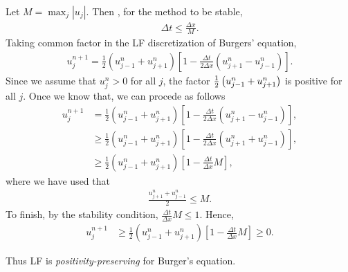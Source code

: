 
\begin{questions}


\begin{solution}

Let $M = \max_j|u_j|$. Then , for the method to be stable, 
\begin{align*}
\Delta t \leq \frac{\Delta x}{M}.
\end{align*} 
Taking common factor in the LF discretization of Burgers' equation,
\begin{align*}
u^{n+1}_j = \frac{1}{2}\left(u_{j-1}^n+u_{j+1}^n\right)\left[1-\frac{\Delta t}{2\Delta x}\left(u_{j+1}^n - u_{j-1}^n\right)\right].
\end{align*}
Since we assume that $u^n_j > 0$ for all $j$, the factor $\frac{1}{2}\left(u_{j-1}^n+u_{j+1}^n\right)$ is positive for all $j$. Once we know that, we can procede as follows
\begin{align*}
u^{n+1}_j &= \frac{1}{2}\left(u_{j-1}^n+u_{j+1}^n\right)\left[1-\frac{\Delta t}{2\Delta x}\left(u_{j+1}^n - u_{j-1}^n\right)\right],\\
&\geq \frac{1}{2}\left(u_{j-1}^n+u_{j+1}^n\right)\left[1-\frac{\Delta t}{2\Delta x}\left(u_{j+1}^n + u_{j-1}^n\right)\right],\\
&\geq \frac{1}{2}\left(u_{j-1}^n+u_{j+1}^n\right)\left[1-\frac{\Delta t}{\Delta x}M\right],
\end{align*}
where we have used that 
\begin{align*}
\frac{u_{j+1}^n + u_{j-1}^n}{2}\leq M.
\end{align*}
To finish, by the stability condition, $\frac{\Delta t}{\Delta x}M\leq 1$. Hence,
\begin{align*}
u^{n+1}_j &\geq \frac{1}{2}\left(u_{j-1}^n+u_{j+1}^n\right)\left[1-\frac{\Delta t}{\Delta x}M\right]\geq 0.
\end{align*}

Thus LF is \textit{positivity-preserving} for Burger's equation.

\end{solution}

\end{questions}
